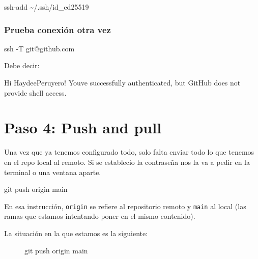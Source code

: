 \documentclass[
  spanish,
  12pt,
  letterpaper,
  DIV=11,
  numbers=noendperiod]{scrreprt}
\newenvironment{Shaded}{\begin{snugshade}}{\end{snugshade}}
\newcommand{\AttributeTok}[1]{\textcolor[rgb]{0.40,0.45,0.13}{#1}}
\newcommand{\ExtensionTok}[1]{\textcolor[rgb]{0.00,0.23,0.31}{#1}}
\newcommand{\FunctionTok}[1]{\textcolor[rgb]{0.28,0.35,0.67}{#1}}
\newcommand{\NormalTok}[1]{\textcolor[rgb]{0.00,0.23,0.31}{#1}}
\newcommand{\StringTok}[1]{\textcolor[rgb]{0.13,0.47,0.30}{#1}}
\begin{document}
\begin{Shaded}
\begin{Highlighting}[]
\FunctionTok{ssh{-}add}\NormalTok{ \textasciitilde{}/.ssh/id\_ed25519}
\end{Highlighting}
\end{Shaded}

\subsubsection{Prueba conexión otra
vez}\label{prueba-conexiuxf3n-otra-vez}

\begin{Shaded}
\begin{Highlighting}[]
\FunctionTok{ssh} \AttributeTok{{-}T}\NormalTok{ git@github.com}
\end{Highlighting}
\end{Shaded}

Debe decir:

\begin{Shaded}
\begin{Highlighting}[]
\ExtensionTok{Hi}\NormalTok{ HaydeePeruyero! You}\StringTok{\textquotesingle{}ve successfully authenticated, but GitHub does not provide shell access.}
\end{Highlighting}
\end{Shaded}

\section{Paso 4: Push and pull}\label{paso-4-push-and-pull}

Una vez que ya tenemos configurado todo, solo falta enviar todo lo que
tenemos en el repo local al remoto. Si se establecio la contraseña nos
la va a pedir en la terminal o una ventana aparte.

\begin{Shaded}
\begin{Highlighting}[]
\FunctionTok{git}\NormalTok{ push origin main}
\end{Highlighting}
\end{Shaded}

En esa instrucción, \texttt{origin} se refiere al repositorio remoto y
\texttt{main} al local (las ramas que estamos intentando poner en el
mismo contenido).

La situación en la que estamos es la siguiente:

\begin{figure}[H]

{\centering 

}

\caption{git push origin main}

\end{figure}%
\end{document}
